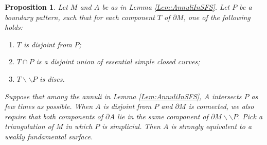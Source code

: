 \documentclass[oneside]{amsart}
\numberwithin{equation}{section}
\theoremstyle{plain}
\newtheorem{proposition}[equation]{Proposition}
\theoremstyle{definition}
\newcommand{\cut}{\backslash\backslash}
\begin{document}
\begin{proposition}
\label{Prop:AnnuliWeaklyFundamental}
Let $M$ and $A$ be as in Lemma \ref{Lem:AnnuliInSFS}. Let $P$ be a boundary pattern, such that for
each component $T$ of $\partial M$, one of the following holds:
\begin{enumerate}
\item $T$ is disjoint from $P$;
\item $T \cap P$ is a disjoint union of essential simple closed curves;
\item $T \cut P$ is discs.
\end{enumerate}
Suppose that among the annuli in Lemma \ref{Lem:AnnuliInSFS}, $A$ intersects $P$ as few times as possible.
When $A$ is disjoint from $P$ and $\partial M$ is connected, we also require that both components of
$\partial A$ lie in the same component of $\partial M \cut P$. Pick a triangulation of $M$ in which
$P$ is simplicial. Then $A$ is strongly equivalent to a
weakly fundamental surface.
\end{proposition}
\end{document}
